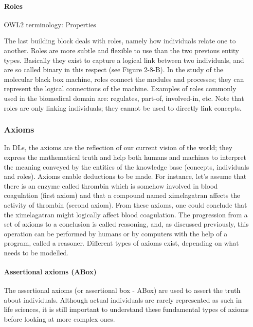 \paragraph{\textbf{Roles}\\}

OWL2 terminology: Properties

The last building block deals with roles, namely how individuals relate one to another. Roles are more subtle and flexible to use than the two previous entity types. Basically they exist to capture a logical link between two individuals, and are so called binary in this respect (see Figure 2-8-B). In the study of the molecular black box machine, roles connect the modules and processes; they can represent the logical connections of the machine. Examples of roles commonly used in the biomedical domain are: regulates, part-of, involved-in, etc. Note that roles are only linking individuals; they cannot be used to directly link concepts.

\subsubsection{Axioms}

In DLs, the axioms are the reflection of our current vision of the world; they express the mathematical truth and help both humans and machines to interpret the meaning conveyed by the entities of the knowledge base (concepts, individuals and roles). Axioms enable deductions to be made. For instance, let's assume that there is an enzyme called thrombin which is somehow involved in blood coagulation (first axiom) and that a compound named ximelagatran affects the activity of thrombin (second axiom). From these axioms, one could conclude that the ximelagatran might logically affect blood coagulation. The progression from a set of axioms to a conclusion is called reasoning, and, as discussed previously, this operation can be performed by humans or by computers with the help of a program, called a reasoner. Different types of axioms exist, depending on what needs to be modelled.

\paragraph{\textbf{Assertional axioms (ABox)}\\}
The assertional axioms (or assertional box - ABox) are used to assert the truth about individuals. Although actual individuals are rarely represented as such in life sciences, it is still important to understand these fundamental types of axioms before looking at more complex ones.

